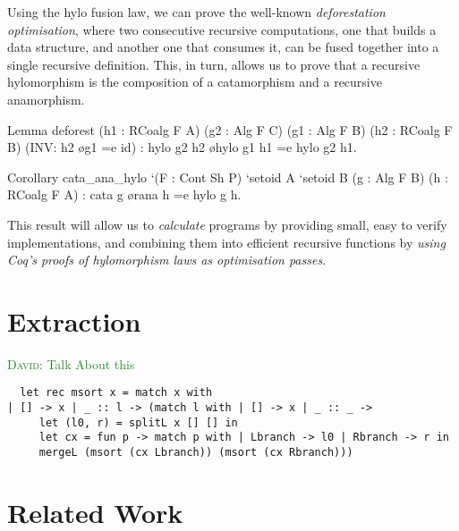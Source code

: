 \documentclass[anonymous, a4paper, UKenglish, cleveref, autoref, thm-restate]{lipics-v2021}
\newcommand{\dcas}[1]{\textcolor{ForestGreen}{\textsc{David}: #1}}
\begin{document}
Using the hylo fusion law, we can prove the well-known \emph{deforestation
optimisation}, where two consecutive recursive computations, one that builds a
data structure, and another one that consumes it, can be fused together into a
single recursive definition. This, in turn, allows us to prove that a recursive
hylomorphism is the composition of a catamorphism and a recursive anamorphism.
\begin{coqcode}
Lemma deforest (h1 : RCoalg F A) (g2 : Alg F C)
  (g1 : Alg F B) (h2 : RCoalg F B) (INV: h2 \o g1 =e id)
  : hylo g2 h2 \o hylo g1 h1 =e hylo g2 h1.

Corollary cata_ana_hylo `(F : Cont Sh P) `{setoid A} `{setoid B}
  (g : Alg F B) (h : RCoalg F A)
: cata g \o rana h =e hylo g h.
\end{coqcode}
This result will allow us to \emph{calculate} programs by providing small, easy
to verify implementations, and combining them into efficient recursive
functions by \emph{using Coq's proofs of hylomorphism laws as optimisation
passes}.


\section{Extraction}

\dcas{Talk About this}
\begin{verbatim}
  let rec msort x = match x with
| [] -> x | _ :: l -> (match l with | [] -> x | _ :: _ ->
     let (l0, r) = splitL x [] [] in
     let cx = fun p -> match p with | Lbranch -> l0 | Rbranch -> r in
     mergeL (msort (cx Lbranch)) (msort (cx Rbranch)))
\end{verbatim}

\section{Related Work}
\end{document}
